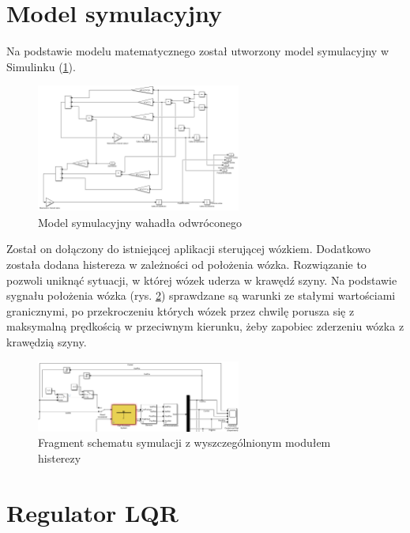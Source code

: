 \documentclass[12pt]{article}
\numberwithin{equation}{section}
\begin{document}
\section{Model symulacyjny}

Na podstawie modelu matematycznego został utworzony model symulacyjny w Simulinku (\ref{fig:model_symulacyjny}).

\begin{figure}[H]
    \centering
    \includegraphics[width=0.6\textwidth]{model_sym.png}
    \caption{Model symulacyjny wahadła odwróconego}
    \label{fig:model_symulacyjny}
\end{figure}

Został on dołączony do istniejącej aplikacji sterującej wózkiem. Dodatkowo została dodana histereza w zależności od położenia wózka. Rozwiązanie to pozwoli uniknąć sytuacji, w której wózek uderza w krawędź szyny. Na podstawie sygnału położenia wózka (rys. \ref{fig:histereza}) sprawdzane są warunki ze stałymi wartościami granicznymi, po przekroczeniu których wózek przez chwilę porusza się z maksymalną prędkością w przeciwnym kierunku, żeby zapobiec zderzeniu wózka z krawędzią szyny.

\begin{figure}[H]
    \centering
    \includegraphics[width=0.6\textwidth]{histereza.png}
    \caption{Fragment schematu symulacji z wyszczególnionym modułem histerezy}
    \label{fig:histereza}
\end{figure}

\section{Regulator LQR}
\end{document}
